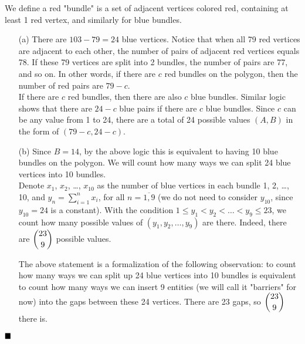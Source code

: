 \documentclass[11pt]{article}
\newenvironment{solution}[1][Solution]{%
  \proof[\normalfont \faPenNib \hspace{0.2cm} \ttfamily \scshape \large #1]%
}{\(\hfill \blacksquare\){\parfillskip0pt\par}}
\theoremstyle{definition}
\begin{document}
        \begin{solution}
            We define a red "bundle" is a set of adjacent vertices colored red, containing at least 1 red vertex, and similarly for blue bundles.
            \begin{enumerate}
                \item[(a)] There are \(103 - 79 = 24\) blue vertices. Notice that when all 79 red vertices are adjacent to each other, the number of pairs of adjacent red vertices equals 78. If these 79 vertices are split into 2 bundles, the number of pairs are 77, and so on. In other words, if there are \(c\) red bundles on the polygon, then the number of red pairs are \(79 - c\).\\
                If there are \(c\) red bundles, then there are also \(c\) blue bundles. Similar logic shows that there are \(24 - c\) blue pairs if there are \(c\) blue bundles. Since \(c\) can be any value from 1 to 24, there are a total of 24 possible values \((A,B)\) in the form of \((79 - c, 24 - c)\).

                \item[(b)] Since \(B = 14\), by the above logic this is equivalent to having 10 blue bundles on the polygon. We will count how many ways we can split 24 blue vertices into 10 bundles.\\
                Denote \(x_1\), \(x_2\), \dots, \(x_{10}\) as the number of blue vertices in each bundle 1, 2, \dots, 10, and \(y_n = \sum\limits_{i=1}^n x_i\), for all \(n = \overline{1,9}\) (we do not need to consider \(y_{10}\), since \(y_{10} = 24\) is a constant). With the condition \(1 \leq y_1 < y_2 < \dots < y_9 \leq 23\), we count how many possible values of \((y_1, y_2, \dots, y_9)\) are there. Indeed, there are \(\dbinom{23}{9}\) possible values.

                \begin{motivation}
                    The above statement is a formalization of the following observation: to count how many ways we can split up 24 blue vertices into 10 bundles is equivalent to count how many ways we can insert 9 entities (we will call it "barriers" for now) into the gaps between these 24 vertices. There are 23 gaps, so \(\dbinom{23}{9}\) there is.
                \end{motivation}


\end{enumerate}
\end{solution}
\end{document}
